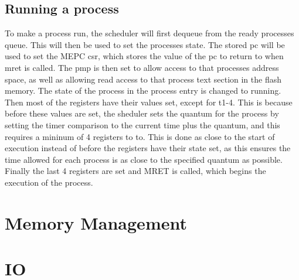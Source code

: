 \subsection{Running a process}
To make a process run, the scheduler will first dequeue from the ready processes queue. This will then be used to set the processes state. The stored pc will be used to set the MEPC csr, which stores the value of the pc to return to when mret is called. The \ac{pmp} is then set to allow access to that processes address space, as well as allowing read access to that process text section in the flash memory. The state of the process in the process entry is changed to running. Then most of the registers have their values set, except for t1-4. This is because before these values are set, the sheduler sets the quantum for the process by setting the timer comparison to the current time plus the quantum, and this requires a mininum of 4 registers to to. This is done as close to the start of execution instead of before the registers have their state set, as this ensures the time allowed for each process is as close to the specified quantum as possible. Finally the last 4 registers are set and MRET is called, which begins the execution of the process.

\section{Memory Management}

\section{IO}